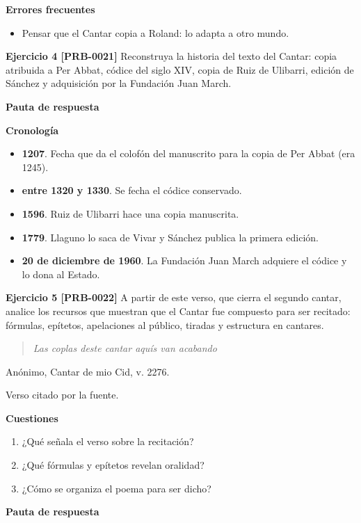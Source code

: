 \documentclass{book}
\begin{document}
\noindent\textbf{Errores frecuentes}
\begin{itemize}
\item Pensar que el Cantar copia a Roland: lo adapta a otro mundo.
\end{itemize}

\noindent\textbf{Ejercicio 4 [PRB-0021]}
Reconstruya la historia del texto del Cantar: copia atribuida a Per Abbat, códice del siglo XIV, copia de Ruiz de Ulibarri, edición de Sánchez y adquisición por la Fundación Juan March.


\noindent\textbf{Pauta de respuesta}

\noindent\textbf{Cronología}
\begin{itemize}
\item \textbf{1207}. Fecha que da el colofón del manuscrito para la copia de Per Abbat (era 1245).
\item \textbf{entre 1320 y 1330}. Se fecha el códice conservado.
\item \textbf{1596}. Ruiz de Ulibarri hace una copia manuscrita.
\item \textbf{1779}. Llaguno lo saca de Vivar y Sánchez publica la primera edición.
\item \textbf{20 de diciembre de 1960}. La Fundación Juan March adquiere el códice y lo dona al Estado.
\end{itemize}

\noindent\textbf{Ejercicio 5 [PRB-0022]}
A partir de este verso, que cierra el segundo cantar, analice los recursos que muestran que el Cantar fue compuesto para ser recitado: fórmulas, epítetos, apelaciones al público, tiradas y estructura en cantares.


\begin{quote}
\itshape Las coplas deste cantar aquís van acabando
\end{quote}
{\noindent\footnotesize Anónimo, Cantar de mio Cid, v. 2276.\par}
{\noindent\footnotesize Verso citado por la fuente.\par}

\noindent\textbf{Cuestiones}
\begin{enumerate}
\item ¿Qué señala el verso sobre la recitación?
\item ¿Qué fórmulas y epítetos revelan oralidad?
\item ¿Cómo se organiza el poema para ser dicho?
\end{enumerate}

\noindent\textbf{Pauta de respuesta}
\end{document}
